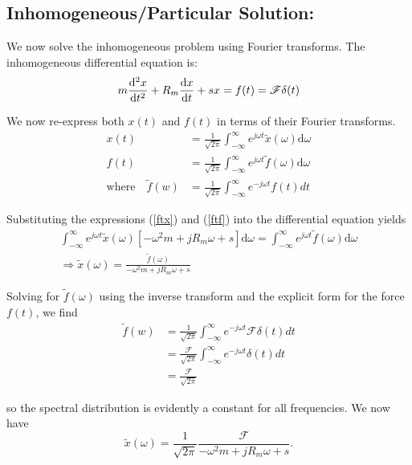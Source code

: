\documentclass{article}
\begin{document}
\subsection*{Inhomogeneous/Particular Solution:}

We now solve the inhomogeneous problem using Fourier transforms. The inhomogeneous differential equation is:
\[
  m \dv[2]{x}{t} + R_m \dv{x}{t} + s x = f(t) = \mathscr{F} \delta(t)
\]

We now re-express both $ x(t) $ and $ f(t) $ in terms of their Fourier transforms.
\begin{align}
    x(t) &= \frac{1}{\sqrt{2\pi}} \int_{-\infty}^{\infty} e^{j \omega t} \tilde{x} (\omega) \mathrm{d} \omega \label{ftx}
    \\
    f(t) &= \frac{1}{\sqrt{2\pi}} \int_{-\infty}^{\infty} e^{j \omega t} \tilde{f} (\omega) \mathrm{d} \omega \label{ftf}
    \\
    \text{where}\quad \tilde{f}(w) &= \frac{1}{\sqrt{2\pi}} \int_{-\infty}^{\infty} e^{-j \omega t} f(t) dt
\end{align}

Substituting the expressions (\ref{ftx}) and (\ref{ftf}) into the differential equation yields
\begin{gather*}
    \int_{-\infty}^{\infty} e^{j \omega t} \tilde{x}(\omega) [-\omega^2 m + j R_m \omega + s] \mathrm{d} \omega
  = \int_{-\infty}^{\infty} e^{j \omega t} \tilde{f}(\omega) \mathrm{d} \omega
  \\
  \Rightarrow \tilde{x}(\omega) = \frac{ \tilde{f}(\omega) }{ -\omega^2 m + j R_m \omega + s }
\end{gather*}

Solving for $ \tilde{f}(\omega) $ using the inverse transform and the explicit form for the force $ f(t) $, we find
\[
  \begin{split}
    \tilde{f}(w) &= \frac{1}{\sqrt{2\pi}} \int_{-\infty}^{\infty} e^{-j \omega t} \mathscr{F} \delta(t) dt
                \\
                &= \frac{ \mathscr{F} }{\sqrt{2\pi}} \int_{-\infty}^{\infty} e^{-j \omega t} \delta(t) dt
                \\
                &= \frac{ \mathscr{F} }{\sqrt{2\pi}}
  \end{split}
\]

so the spectral distribution is evidently a constant for all frequencies. We now have
\begin{equation}
  \tilde{x}(\omega) = \frac{1}{\sqrt{2\pi}} \frac{ \mathscr{F} }{ -\omega^2 m + j R_m \omega + s }. \label{xw}
\end{equation}
\end{document}
